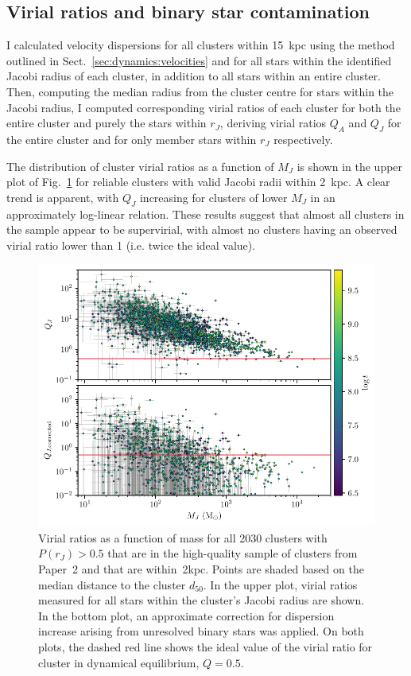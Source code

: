 \subsection{Virial ratios and binary star contamination}
\label{sec:dynamics:results:virial}

I calculated velocity dispersions for all clusters within 15~kpc using the method outlined in Sect.~\ref{sec:dynamics:velocities} and for all stars within the identified Jacobi radius of each cluster, in addition to all stars within an entire cluster. Then, computing the median radius from the cluster centre for stars within the Jacobi radius, I computed corresponding virial ratios of each cluster for both the entire cluster and purely the stars within $r_J$, deriving virial ratios $Q_A$ and $Q_J$ for the entire cluster and for only member stars within $r_J$ respectively.

The distribution of cluster virial ratios as a function of $M_J$ is shown in the upper plot of Fig.~\ref{fig:dynamics:results:virial_vs_mass} for reliable clusters with valid Jacobi radii within 2~kpc. A clear trend is apparent, with $Q_J$ increasing for clusters of lower $M_J$ in an approximately log-linear relation. These results suggest that almost all clusters in the sample appear to be supervirial, with almost no clusters having an observed virial ratio lower than 1 (i.e. twice the ideal value).

\begin{figure}[t]
    \centering
    \includegraphics[width=\textwidth]{fig/c4/results_virial_vs_mass.pdf}
    \caption[Virial ratios as a function of mass for all clusters with $P(r_J) > 0.5$]{Virial ratios as a function of mass for all 2030 clusters with $P(r_J) > 0.5$ that are in the high-quality sample of clusters from Paper~2 and that are within~2kpc. Points are shaded based on the median distance to the cluster $d_{50}$. In the upper plot, virial ratios measured for all stars within the cluster's Jacobi radius are shown. In the bottom plot, an approximate correction for dispersion increase arising from unresolved binary stars was applied. On both plots, the dashed red line shows the ideal value of the virial ratio for cluster in dynamical equilibrium, $Q=0.5$.}
    \label{fig:dynamics:results:virial_vs_mass}
\end{figure}

